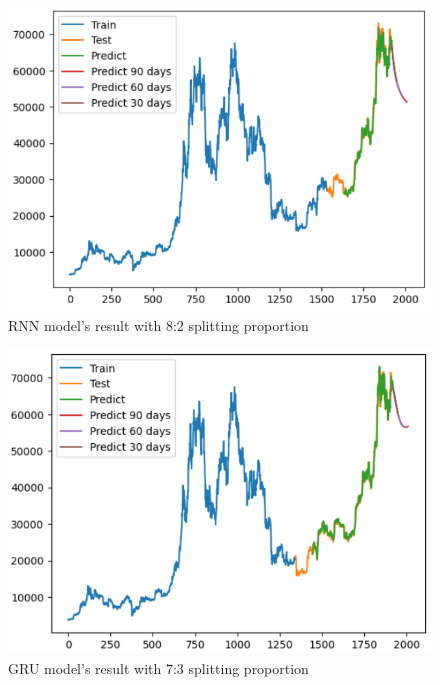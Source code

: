 \documentclass{ieeeojies}
\begin{document}
\begin{figure}[H]
	\centering
	\begin{minipage}{0.6\linewidth}
		\centering
		\includegraphics[width=\linewidth]{bibliography/Images/RNN_BTC_82.PNG}
		\caption{RNN model's result with 8:2 splitting proportion}
	\end{minipage}
\end{figure}
\begin{figure}[H]
	\centering
	\begin{minipage}{0.6\linewidth}
		\centering
		\includegraphics[width=\linewidth]{bibliography/Images/GRU_BTC_73.PNG}
		\caption{GRU model's result with 7:3 splitting proportion}
	\end{minipage}
\end{figure}
\end{document}
